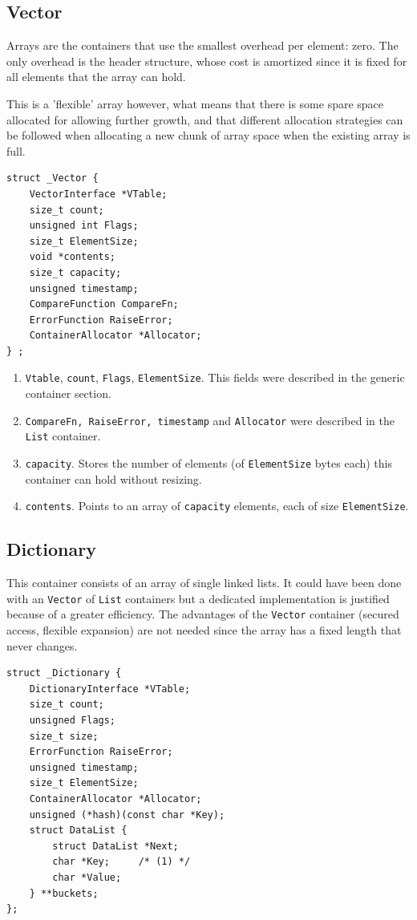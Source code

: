 \documentclass[12pt,a4paper,openany]{memoir} %
\begin{document}
{{\subsection{Vector}
Arrays are the containers that use the smallest overhead per element: zero. The only overhead is the header structure, whose cost is amortized since it is fixed for all elements that the array can hold.

This is a 'flexible' array however, what means that there is some spare space allocated for allowing further growth, and that different allocation strategies can be followed when allocating a new chunk of array space when the existing array is full.
\begin{verbatim}
struct _Vector {
    VectorInterface *VTable;
    size_t count;          
    unsigned int Flags;    
    size_t ElementSize;	
    void *contents;        
    size_t capacity;       
    unsigned timestamp;
    CompareFunction CompareFn;
    ErrorFunction RaiseError;
    ContainerAllocator *Allocator;
} ;
\end{verbatim}
\begin{enumerate}
\item \texttt{Vtable}, \texttt{count}, \texttt{Flags}, \texttt{ElementSize}. This fields were described in the generic container section.
\item \texttt{CompareFn, RaiseError, timestamp} and \texttt{Allocator} were described in the \texttt{List} container.
\item \texttt{capacity}. Stores the number of elements (of \verb,ElementSize, bytes each) this container can hold without resizing.
\item \texttt{contents}. Points to an array of \texttt{capacity} elements, each of size \texttt{ElementSize}.
\end{enumerate}
\subsection{Dictionary}
This container consists of an array of single linked lists. It could have been done with an \texttt{Vector} of \texttt{List} containers but a dedicated implementation is justified because of a greater efficiency. The advantages of the \texttt{Vector} container (secured access, flexible expansion) are not needed since the array has a fixed length that never changes.
\begin{verbatim}
struct _Dictionary {
    DictionaryInterface *VTable;
    size_t count;
    unsigned Flags;
    size_t size;
    ErrorFunction RaiseError;
    unsigned timestamp;
    size_t ElementSize;
    ContainerAllocator *Allocator;
    unsigned (*hash)(const char *Key);
    struct DataList {
        struct DataList *Next;
        char *Key;     /* (1) */
        char *Value;
    } **buckets;
};
\end{verbatim}

}}
\end{document}
